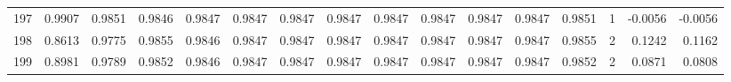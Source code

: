 \begin{tabular}{lrrrrrrrrrrrrrrr}
197 &      0.9907 &  0.9851 &  0.9846 &  0.9847 &  0.9847 &  0.9847 &  0.9847 &  0.9847 &  0.9847 &  0.9847 &   0.9847 &     0.9851 &      1 &                   -0.0056 &                    -0.0056 \\
198 &      0.8613 &  0.9775 &  0.9855 &  0.9846 &  0.9847 &  0.9847 &  0.9847 &  0.9847 &  0.9847 &  0.9847 &   0.9847 &     0.9855 &      2 &                    0.1242 &                     0.1162 \\
199 &      0.8981 &  0.9789 &  0.9852 &  0.9846 &  0.9847 &  0.9847 &  0.9847 &  0.9847 &  0.9847 &  0.9847 &   0.9847 &     0.9852 &      2 &                    0.0871 &                     0.0808 \\
\bottomrule
\end{tabular}
